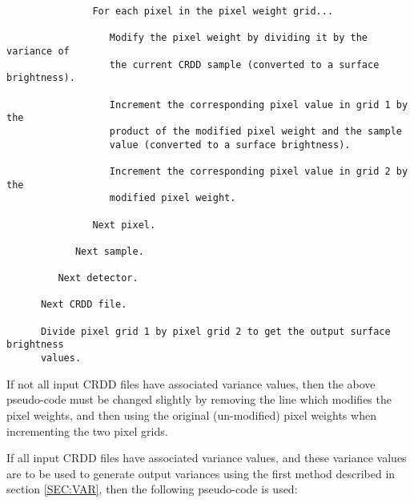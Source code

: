 \begin{verbatim}
               For each pixel in the pixel weight grid...

                  Modify the pixel weight by dividing it by the variance of
                  the current CRDD sample (converted to a surface brightness).

                  Increment the corresponding pixel value in grid 1 by the 
                  product of the modified pixel weight and the sample
                  value (converted to a surface brightness).

                  Increment the corresponding pixel value in grid 2 by the 
                  modified pixel weight.

               Next pixel.

            Next sample.

         Next detector.

      Next CRDD file.

      Divide pixel grid 1 by pixel grid 2 to get the output surface brightness
      values.

\end{verbatim}

If not all input CRDD files have associated variance values, then the above 
pseudo-code must be changed slightly by removing the line which modifies the 
pixel weights, and then using the original (un-modified) pixel weights when
incrementing the two pixel grids.

If all input CRDD files have associated variance values, and these variance 
values are to be used to generate output variances using the first method 
described in section \ref {SEC:VAR}, then the following pseudo-code 
is used:

